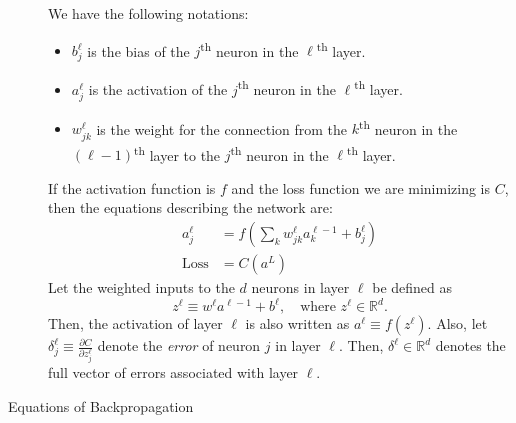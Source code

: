 \documentclass[10pt,landscape,a4paper]{article}
\begin{document}
\begin{multicols*}{3}
\begin{description}
\begin{center}
	\end{center}
	We have the following notations:
	\begin{itemize}
		\item $b_j^{\ell}$ is the bias of the $j$\textsuperscript{th} neuron in the $\ell$\textsuperscript{th} layer.
		\item $a_j^{\ell}$ is the activation of the $j$\textsuperscript{th} neuron in the $\ell$\textsuperscript{th} layer.
		\item $w_{jk}^\ell$ is the weight for the connection from the $k$\textsuperscript{th} neuron in the $(\ell-1)$\textsuperscript{th} layer to the $j$\textsuperscript{th} neuron in the $\ell$\textsuperscript{th} layer.
	\end{itemize}
	If the activation function is $f$ and the loss function we are minimizing is $C$, then the equations describing the network are:
	\begin{align*}
		a_j^\ell&=f\left(\sum_{k}w_{jk}^\ell a_k^{\ell-1}+b_j^\ell\right)\\
		\text{Loss}&=C\left(a^L\right)
	\end{align*}
	Let the weighted inputs to the $d$ neurons in layer $\ell$ be defined as
	$$z^\ell\equiv w^\ell a^{\ell-1}+b^\ell,\quad\text{where }z^\ell\in\mathbb{R}^d.$$
	Then, the activation of layer $\ell$ is also written as $a^\ell\equiv f(z^\ell)$. Also, let $\delta_j^\ell\equiv\frac{\partial C}{\partial z_j^\ell}$ denote the {\it error} of neuron $j$ in layer $\ell$. Then, $\delta^\ell\in\mathbb{R}^d$ denotes the full vector of errors associated with layer $\ell$.
	\item[Equations of Backpropagation] ~
	\begin{align*}

\end{align*}
\end{description}
\end{multicols*}
\end{document}
